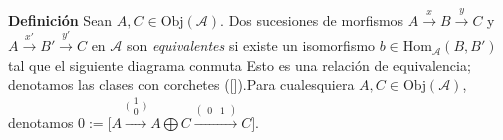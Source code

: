 \documentclass[preview]{standalone}
\begin{document}
\begin{center}
\justifying \textbf{Definición} Sean $A,C\in\text{Obj}(\mathscr{A})$. Dos sucesiones de morfismos $A\xrightarrow{x}B\xrightarrow{y}C$ y $A\xrightarrow{x'}B'\xrightarrow{y'}C$ en $\mathscr{A}$ son \emph{equivalentes} si existe un isomorfismo $b\in\text{Hom}_\mathscr{A}(B,B')$ tal que el siguiente diagrama conmuta \break \vspace{5mm}Esto es una relación de equivalencia; denotamos las clases con corchetes ([]).Para cualesquiera $A,C\in\text{Obj}(\mathscr{A})$, denotamos $0:= \bigg[ A \xrightarrow{\big(\begin{smallmatrix}1 \\ 0\end{smallmatrix}\big)} A\bigoplus C \xrightarrow{(\begin{smallmatrix} 0 &1 \end{smallmatrix})} C \bigg].$
\end{center}
\end{document}
